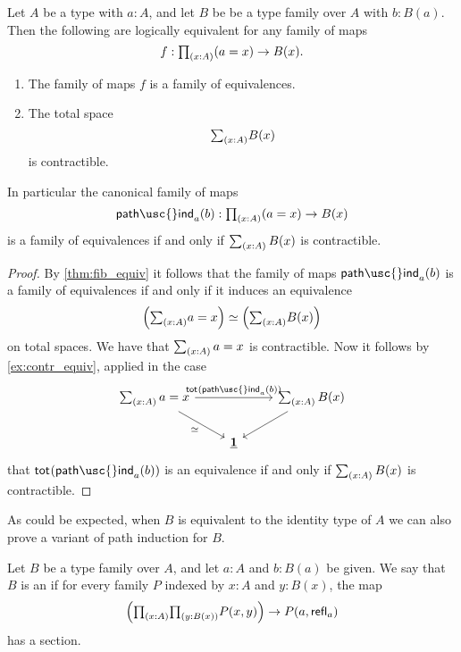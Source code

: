 \begin{thm}\label{thm:id_fundamental}
Let $A$ be a type with $a:A$, and let $B$ be be a type family over $A$ with $b:B(a)$.
Then  the following are logically equivalent for any family of maps
\begin{equation*}
  f:\prd{x:A}(a=x)\to B(x).
\end{equation*}
\begin{enumerate}
\item The family of maps $f$ is a family of equivalences.
\item The total space
\begin{equation*}
\sm{x:A}B(x)
\end{equation*}
is contractible.
\end{enumerate}
In particular the canonical family of maps
\begin{equation*}
\mathsf{path\usc{}ind}_a(b):\prd{x:A} (a=x)\to B(x)
\end{equation*}
is a family of equivalences if and only if $\sm{x:A}B(x)$ is contractible.
\end{thm}

\begin{proof}
By \cref{thm:fib_equiv} it follows that the family of maps $\mathsf{path\usc{}ind}_a(b)$ is a family of equivalences if and only if it induces an equivalence
\begin{equation*}
\eqv{\Big(\sm{x:A}a=x\Big)}{\Big(\sm{x:A}B(x)\Big)}
\end{equation*}
on total spaces. We have that $\sm{x:A}a=x$ is contractible. Now it follows by \cref{ex:contr_equiv}, applied in the case
\begin{equation*}
\begin{tikzcd}
\sm{x:A}a=x \arrow[rr,"\total{\mathsf{path\usc{}ind}_a(b)}"] \arrow[dr,swap,"\eqvsym"] & & \sm{x:A}B(x) \arrow[dl] \\
& \unit
\end{tikzcd}
\end{equation*}
that $\total{\mathsf{path\usc{}ind}_a(b)}$ is an equivalence if and only if $\sm{x:A}B(x)$ is contractible.
\end{proof}

As could be expected, when $B$ is equivalent to the identity type of $A$ we can also prove a variant of path induction for $B$.

\begin{defn}
  Let $B$ be a type family over $A$, and let $a:A$ and $b:B(a)$ be given. We say that $B$ is an  if for every family $P$ indexed by $x:A$ and $y:B(x)$, the map
  \begin{equation*}
    \Big(\prd{x:A}{y:B(x)}P(x,y)\Big)\to P(a,\refl{a})
  \end{equation*}
  has a section.
\end{defn}

